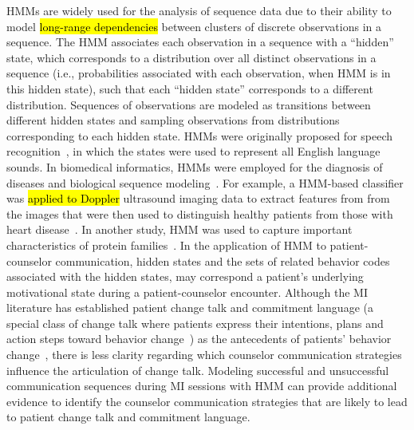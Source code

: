 \documentclass[smallextended]{svjour3}       %
\begin{document}
HMMs are widely used for the analysis of sequence data due to their ability to model \hl{long-range dependencies} between clusters of discrete observations in a sequence. The HMM associates each observation in a sequence with a ``hidden'' state, which corresponds to a distribution over all distinct observations in a sequence (i.e., probabilities associated with each observation, when HMM is in this hidden state), such that each ``hidden state'' corresponds to a different distribution. Sequences of observations are modeled as transitions between different hidden states and sampling observations from distributions corresponding to each hidden state. HMMs were originally proposed for speech recognition~\cite{rabiner1989tutorial}, in which the states were used to represent all English language sounds. In biomedical informatics, HMMs were employed for the diagnosis of diseases and biological sequence modeling~\cite{uuguz2007biomedical, amrhein2003client}. For example, a HMM-based classifier was \hl{applied to Doppler} ultrasound imaging data to extract features from from the images that were then used to distinguish healthy patients from those with heart disease~\cite{uuguz2007biomedical}. In another study, HMM was used to capture important
characteristics of protein families~\cite{amrhein2003client}. In the application of HMM to patient-counselor communication, hidden states and the sets of related behavior codes associated with the hidden states, may correspond a patient’s underlying motivational state during a patient-counselor encounter. Although the MI literature has established patient change talk and commitment language (a special class of change talk where patients express their intentions, plans and action steps toward behavior change~\cite{baldi1994hidden}) as the antecedents of patients' behavior change~\cite{apodaca2009mechanisms}, there is less clarity regarding which counselor communication strategies influence the articulation of change talk. Modeling successful and unsuccessful communication sequences during MI sessions with HMM can provide additional evidence to identify the counselor communication strategies that are likely to lead to patient change talk and commitment language. 
\end{document}
